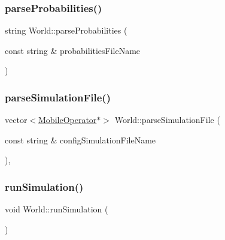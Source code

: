\mbox{\label{class_world_a5675c3a896891827dd59255a9761f08e}} 
\subsubsection{\texorpdfstring{parse\+Probabilities()}{parseProbabilities()}}
{\footnotesize\ttfamily string World\+::parse\+Probabilities (\begin{DoxyParamCaption}\item[{const string \&}]{probabilities\+File\+Name }\end{DoxyParamCaption})\hspace{0.3cm}{\ttfamily [private]}}

\mbox{\label{class_world_adef43cc4ccb918aa68c00ee1e3286321}} 
\subsubsection{\texorpdfstring{parse\+Simulation\+File()}{parseSimulationFile()}}
{\footnotesize\ttfamily vector$<$\hyperlink{class_mobile_operator}{Mobile\+Operator}$\ast$$>$ World\+::parse\+Simulation\+File (\begin{DoxyParamCaption}\item[{const string \&}]{config\+Simulation\+File\+Name }\end{DoxyParamCaption})\hspace{0.3cm}{\ttfamily [private]}, {\ttfamily [noexcept]}}

\mbox{\label{class_world_aa825a43f968c8fe750c67156e64721ff}} 
\subsubsection{\texorpdfstring{run\+Simulation()}{runSimulation()}}
{\footnotesize\ttfamily void World\+::run\+Simulation (\begin{DoxyParamCaption}{ }\end{DoxyParamCaption})\hspace{0.3cm}{\ttfamily [noexcept]}}


